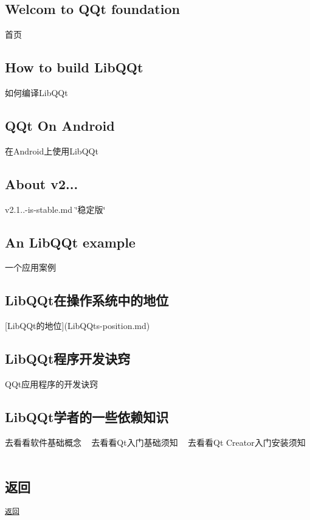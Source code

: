 \subsection*{Welcom to Q\+Qt foundation}

首页 ~\newline
 \subsection*{How to build Lib\+Q\+Qt}

如何编译\+Lib\+Q\+Qt ~\newline
 \subsection*{Q\+Qt On Android}

在\+Android上使用\+Lib\+Q\+Qt ~\newline
 \subsection*{About v2...}

v2.1..-\/is-\/stable.\+md \char`\"{}稳定版\char`\"{} ~\newline
 \subsection*{An Lib\+Q\+Qt example}

一个应用案例 ~\newline
 \subsection*{Lib\+Q\+Qt在操作系统中的地位}

\mbox{[}Lib\+Q\+Qt的地位\mbox{]}(Lib\+Q\+Qt\textquotesingle{}s-\/position.\+md) ~\newline
 \subsection*{Lib\+Q\+Qt程序开发诀窍}

Q\+Qt应用程序的开发诀窍 ~\newline
 \subsection*{Lib\+Q\+Qt学者的一些依赖知识}

去看看软件基础概念 ~\newline
去看看\+Qt入门基础须知 ~\newline
去看看\+Qt Creator入门安装须知 ~\newline
 \subsection*{返回}

\href{../}{\tt 返回} 